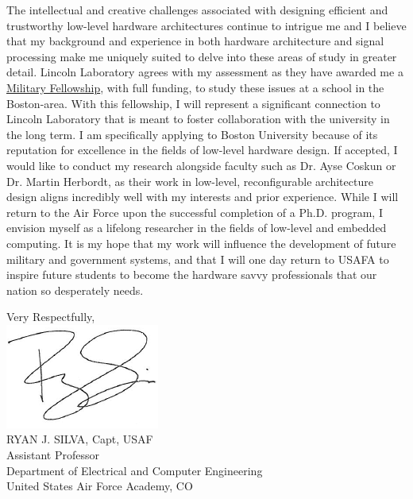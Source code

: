 \documentclass{article}
\begin{document}
The intellectual and creative challenges associated with designing efficient
 and trustworthy low-level hardware architectures continue to intrigue me and I believe that my
background and experience in both hardware architecture and signal processing make
me uniquely suited to delve into these areas of study in greater detail.
Lincoln Laboratory agrees with my assessment as they have awarded me a
\href{http://www.ll.mit.edu/college/fellowsprograms.html}{Military Fellowship},
with full funding, to study these issues at a school in the Boston-area. With
this fellowship, I will represent a significant connection to Lincoln
Laboratory that
is meant to foster collaboration with the university in the long term. I am
specifically applying to Boston University because of its reputation for excellence in
the fields of low-level hardware design. If accepted, I would like
to conduct my research alongside faculty such as Dr. Ayse Coskun or
Dr. Martin Herbordt, as their work in low-level, reconfigurable architecture
design aligns incredibly well with my interests and prior experience. While I
will return to the Air Force upon the successful completion of a Ph.D. program,
I envision myself as a lifelong researcher in the fields of low-level and
embedded computing. It is my hope that my work will influence the development
of future military and government systems, and that I will one day return to
USAFA to inspire future students to become the hardware savvy professionals
that our nation so desperately needs.

\vspace{2mm}
\hspace*{2.3in} \noindent Very Respectfully, \\
\hspace*{2.5in} \includegraphics[scale=.5]{silvasig}  \\
\hspace*{2.5in} RYAN J. SILVA, Capt, USAF \\
\hspace*{2.5in} Assistant Professor   \\
\hspace*{2.5in} Department of Electrical and Computer Engineering  \\
\hspace*{2.5in} United States Air Force Academy, CO  
\end{document}
